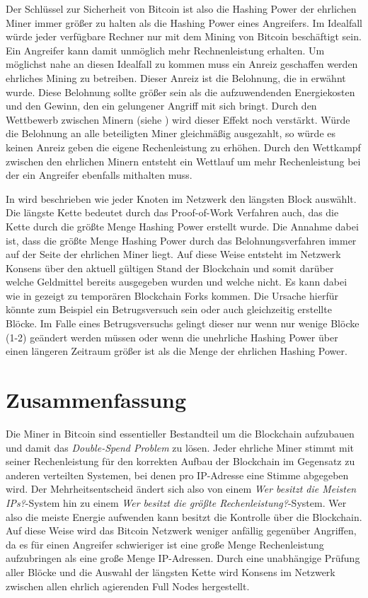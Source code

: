 \documentclass[ngerman,runningheads,a4paper]{llncs}[2018/03/10]
\begin{document}
Der Schlüssel zur Sicherheit von Bitcoin ist also die Hashing Power der ehrlichen Miner immer größer zu halten als die Hashing Power eines Angreifers. Im Idealfall würde jeder verfügbare Rechner nur mit dem Mining von Bitcoin beschäftigt sein. Ein Angreifer kann damit unmöglich mehr Rechnenleistung erhalten. Um möglichst nahe an diesen Idealfall zu kommen muss ein Anreiz geschaffen werden ehrliches Mining zu betreiben. Dieser Anreiz ist die Belohnung, die in  erwähnt wurde. Diese Belohnung sollte größer sein als die aufzuwendenden Energiekosten und den Gewinn, den ein gelungener Angriff mit sich bringt. Durch den Wettbewerb zwischen Minern (siehe ) wird dieser Effekt noch verstärkt. Würde die Belohnung an alle beteiligten Miner gleichmäßig ausgezahlt, so würde es keinen Anreiz geben die eigene Rechenleistung zu erhöhen. Durch den Wettkampf zwischen den ehrlichen Minern entsteht ein Wettlauf um mehr Rechenleistung bei der ein Angreifer ebenfalls mithalten muss.

In  wird beschrieben wie jeder Knoten im Netzwerk den längsten Block auswählt. Die längste Kette bedeutet durch das Proof-of-Work Verfahren auch, das die Kette durch die größte Menge Hashing Power erstellt wurde. Die Annahme dabei ist, dass die größte Menge Hashing Power durch das Belohnungsverfahren immer auf der Seite der ehrlichen Miner liegt. Auf diese Weise entsteht im Netzwerk Konsens über den aktuell gültigen Stand der Blockchain und somit darüber welche Geldmittel bereits ausgegeben wurden und welche nicht. Es kann dabei wie in  gezeigt zu temporären Blockchain Forks kommen. Die Ursache hierfür könnte zum Beispiel ein Betrugsversuch sein oder auch gleichzeitig erstellte Blöcke. Im Falle eines Betrugsversuchs gelingt dieser nur wenn nur wenige Blöcke (1-2) geändert werden müssen oder wenn die unehrliche Hashing Power über einen längeren Zeitraum größer ist als die Menge der ehrlichen Hashing Power.

\section{Zusammenfassung}\label{sec:Zusammenfassung}

Die Miner in Bitcoin sind essentieller Bestandteil um die Blockchain aufzubauen und damit das \textit{Double-Spend Problem} zu lösen. Jeder ehrliche Miner stimmt mit seiner Rechenleistung für den korrekten Aufbau der Blockchain im Gegensatz zu anderen verteilten Systemen, bei denen pro IP-Adresse eine Stimme abgegeben wird. Der Mehrheitsentscheid ändert sich also von einem \textit{Wer besitzt die Meisten IPs?}-System hin zu einem \textit{Wer besitzt die größte Rechenleistung?}-System. Wer also die meiste Energie aufwenden kann besitzt die Kontrolle über die Blockchain. Auf diese Weise wird das Bitcoin Netzwerk weniger anfällig gegenüber Angriffen, da es für einen Angreifer schwieriger ist eine große Menge Rechenleistung aufzubringen als eine große Menge IP-Adressen. Durch eine unabhängige Prüfung aller Blöcke und die Auswahl der längsten Kette wird Konsens im Netzwerk zwischen allen ehrlich agierenden Full Nodes hergestellt.
\end{document}
